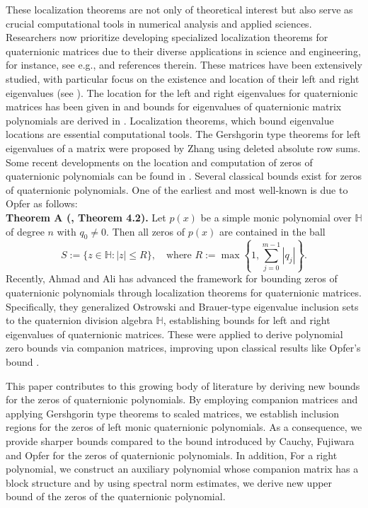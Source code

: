 \documentclass [12pt]{article}
\begin{document}
These localization theorems are not only of theoretical interest but also serve as crucial computational tools in numerical analysis and applied sciences. Researchers now prioritize developing specialized localization theorems  for quaternionic matrices  due to their diverse applications in science and engineering, for instance, see e.g., \cite{BA,HL,WRL,ZF1,ZF2,ZJ} and references therein. 
These matrices have been extensively studied, with particular focus on the existence and location of their left and right eigenvalues (see \cite{BA,BJL,WRM}). The location for the left and right eigenvalues for quaternionic matrices 
has been given in  \cite{ASL,BA,CJH,GAB,HTL,PR,RL} and bounds for eigenvalues of quaternionic matrix polynomials are derived in  \cite{ASS}. Localization theorems, which bound eigenvalue locations are essential computational tools. The Gershgorin type theorems for left eigenvalues of a matrix  were proposed by Zhang \cite{ZF1}  using deleted absolute row sums. Some
recent developments on the location and computation of zeros of quaternionic polynomials can be found
in \cite{GM,JO1,JO2,LDL,IN,O,PS,SR}. Several classical bounds exist for zeros of quaternionic polynomials. One of the earliest and most well-known is due to Opfer as follows:\\
\textbf{Theorem A (\cite{O}, Theorem 4.2).} Let \( p(x) \) be a simple monic polynomial over \( \mathbb{H} \) of degree \( n \) with \( q_0 \neq 0 \). Then all zeros of \( p(x) \) are contained in the ball
\[
S := \{ z \in \mathbb{H} : |z| \leq R \}, \quad \text{where } R := \max \left\{ 1, \sum_{j=0}^{m-1} |q_j| \right\}.
\]
Recently, Ahmad and Ali \cite{ASS2} has advanced the framework for bounding zeros of quaternionic polynomials through localization theorems for quaternionic matrices. Specifically, they generalized Ostrowski and Brauer-type eigenvalue inclusion sets to the quaternion division algebra \(\mathbb{H}\), establishing bounds for left and right eigenvalues of quaternionic matrices. These were applied to derive polynomial zero bounds via companion matrices, improving upon classical results like Opfer's bound \cite{O}.

\indent This paper contributes to this growing body of literature by deriving new bounds for the zeros of quaternionic polynomials. By employing companion matrices and applying  Gershgorin type theorems to scaled matrices, we establish  inclusion regions for the zeros of left monic quaternionic polynomials. As a consequence, we
provide sharper bounds compared to the bound introduced by Cauchy, Fujiwara and Opfer for the zeros of quaternionic
polynomials. In addition, For a right polynomial, we construct an auxiliary polynomial whose companion matrix has a block structure and by using spectral norm estimates, we derive new upper bound of the zeros of the quaternionic polynomial.
\end{document}
